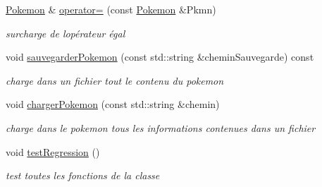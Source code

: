 \begin{DoxyCompactItemize}
\hyperlink{class_pokemon}{Pokemon} \& \hyperlink{class_pokemon_aa991f8c70046ffb8739bba5f09a6dd79}{operator=} (const \hyperlink{class_pokemon}{Pokemon} \&Pkmn)
\begin{DoxyCompactList}\small\item\em surcharge de l\textquotesingle{}opérateur égal \end{DoxyCompactList}\item 
void \hyperlink{class_pokemon_a30cc5a78e55f02b460c37f9b326864d9}{sauvegarder\+Pokemon} (const std\+::string \&chemin\+Sauvegarde) const
\begin{DoxyCompactList}\small\item\em charge dans un fichier tout le contenu du pokemon \end{DoxyCompactList}\item 
void \hyperlink{class_pokemon_a26771eddf70badfce2fe1aeaf2d89b81}{charger\+Pokemon} (const std\+::string \&chemin)
\begin{DoxyCompactList}\small\item\em charge dans le pokemon tous les informations contenues dans un fichier \end{DoxyCompactList}\item 
\mbox{\label{class_pokemon_a1702b9d4b17a506f4f14a1f0ac142553}} 
void \hyperlink{class_pokemon_a1702b9d4b17a506f4f14a1f0ac142553}{test\+Regression} ()
\begin{DoxyCompactList}\small\item\em test toutes les fonctions de la classe \end{DoxyCompactList}\end{DoxyCompactItemize}
